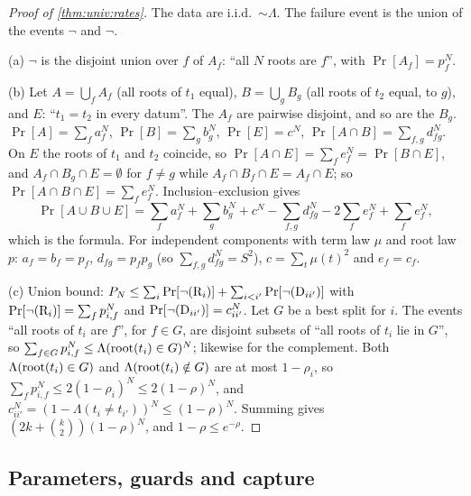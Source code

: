 \begin{proof}[Proof of \cref{thm:univ:rates}]
The data are i.i.d.\ $\sim\Lambda$. The failure event is the union of the events $\neg$ and $\neg$.

(a) $\neg$ is the disjoint union over $f$ of $A_f$: ``all $N$ roots are $f$'', with $\Pr[A_f]=p_f^N$.

(b) Let $A=\bigcup_fA_f$ (all roots of $t_1$ equal), $B=\bigcup_gB_g$ (all roots of $t_2$ equal, to $g$), and $E$: ``$t_1=t_2$ in every datum''. The $A_f$ are pairwise disjoint, and so are the $B_g$. $\Pr[A]=\sum_fa_f^N$, $\Pr[B]=\sum_gb_g^N$, $\Pr[E]=c^N$, $\Pr[A\cap B]=\sum_{f,g}d_{fg}^N$. On $E$ the roots of $t_1$ and $t_2$ coincide, so $\Pr[A\cap E]=\sum_fe_f^N=\Pr[B\cap E]$, and $A_f\cap B_g\cap E=\emptyset$ for $f\neq g$ while $A_f\cap B_f\cap E=A_f\cap E$; so $\Pr[A\cap B\cap E]=\sum_fe_f^N$. Inclusion--exclusion gives
\[\Pr[A\cup B\cup E]=\textstyle\sum_fa_f^N+\sum_gb_g^N+c^N-\sum_{f,g}d_{fg}^N-2\sum_fe_f^N+\sum_fe_f^N,\]
which is the formula. For independent components with term law $\mu$ and root law $p$: $a_f=b_f=p_f$, $d_{fg}=p_fp_g$ (so $\sum_{f,g}d_{fg}^N=S^2$), $c=\sum_t\mu(t)^2$ and $e_f=c_f$.

(c) Union bound: $P_N\le\sum_i\Pr[\neg\text{\textup{(R$_{i}$)}}]+\sum_{i<i'}\Pr[\neg\text{\textup{(D$_{ii'}$)}}]$ with $\Pr[\neg\text{\textup{(R$_{i}$)}}]=\sum_fp_{i,f}^N$ and $\Pr[\neg\text{\textup{(D$_{ii'}$)}}]=c_{ii'}^N$. Let $G$ be a best split for $i$. The events ``all roots of $t_i$ are $f$'', for $f\in G$, are disjoint subsets of ``all roots of $t_i$ lie in $G$'', so $\sum_{f\in G}p_{i,f}^N\le\Lambda(\mathrm{root}(t_i)\in G)^N$; likewise for the complement. Both $\Lambda(\mathrm{root}(t_i)\in G)$ and $\Lambda(\mathrm{root}(t_i)\notin G)$ are at most $1-\rho_i$, so $\sum_fp_{i,f}^N\le2(1-\rho_i)^N\le2(1-\rho)^N$, and $c_{ii'}^N=(1-\Lambda(t_i\neq t_{i'}))^N\le(1-\rho)^N$. Summing gives $(2k+\binom k2)(1-\rho)^N$, and $1-\rho\le e^{-\rho}$.
\end{proof}

\subsection{Parameters, guards and capture}\label{app:univ:capture}

